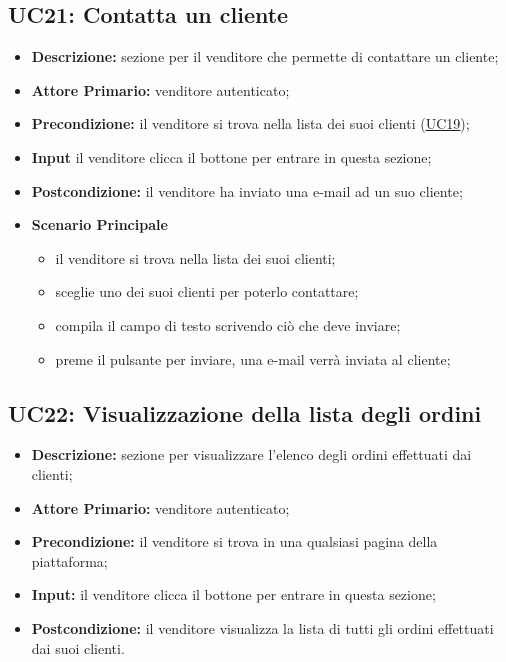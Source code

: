         \subsection{UC21: Contatta un cliente}
        \label{sec:UC21}
        \begin{itemize}
            \item \textbf{Descrizione:} sezione per il venditore che permette di contattare un cliente;
            \item \textbf{Attore Primario:} venditore autenticato;
            \item \textbf{Precondizione:} il venditore si trova nella lista dei suoi clienti (\hyperref[sec:UC19]{\underline{UC19}});
            \item \textbf{Input} il venditore clicca il bottone per entrare in questa sezione; 
            \item \textbf{Postcondizione:} il venditore ha inviato una e-mail ad un suo cliente;
            \item \textbf{Scenario Principale}
                \begin{itemize}
                    \item il venditore si trova nella lista dei suoi clienti;
                    \item sceglie uno dei suoi clienti per poterlo contattare;
                    \item compila il campo di testo scrivendo ciò che deve inviare;
                    \item preme il pulsante per inviare, una e-mail verrà inviata al cliente;
                \end{itemize}
        \end{itemize}
        \subsection{UC22: Visualizzazione della lista degli ordini}
        \label{sec:UC22}
        \begin{itemize}
            \item \textbf{Descrizione:} sezione per visualizzare l'elenco degli ordini effettuati dai clienti;
            \item \textbf{Attore Primario:} venditore autenticato; 
            \item \textbf{Precondizione:} il venditore si trova in una qualsiasi pagina della piattaforma;
            \item \textbf{Input:} il venditore clicca il bottone per entrare in questa sezione; 
            \item \textbf{Postcondizione:} il venditore visualizza la lista di tutti gli ordini effettuati dai suoi clienti.
        \end{itemize}
        
